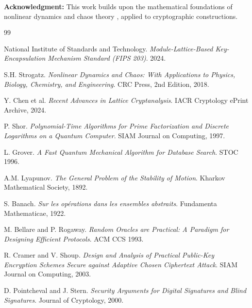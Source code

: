 \documentclass{article}
\begin{document}
\textbf{Acknowledgment:} This work builds upon the mathematical foundations of nonlinear dynamics and chaos theory \cite{strogatz2018}, applied to cryptographic constructions.

\begin{thebibliography}{99}

National Institute of Standards and Technology.
\textit{Module-Lattice-Based Key-Encapsulation Mechanism Standard (FIPS 203)}.
2024.

S.H. Strogatz.
\textit{Nonlinear Dynamics and Chaos: With Applications to Physics, Biology, Chemistry, and Engineering}.
CRC Press, 2nd Edition, 2018.

Y. Chen et al.
\textit{Recent Advances in Lattice Cryptanalysis}.
IACR Cryptology ePrint Archive, 2024.

P. Shor.
\textit{Polynomial-Time Algorithms for Prime Factorization and Discrete Logarithms on a Quantum Computer}.
SIAM Journal on Computing, 1997.

L. Grover.
\textit{A Fast Quantum Mechanical Algorithm for Database Search}.
STOC 1996.

A.M. Lyapunov.
\textit{The General Problem of the Stability of Motion}.
Kharkov Mathematical Society, 1892.

S. Banach.
\textit{Sur les op\'erations dans les ensembles abstraits}.
Fundamenta Mathematicae, 1922.

M. Bellare and P. Rogaway.
\textit{Random Oracles are Practical: A Paradigm for Designing Efficient Protocols}.
ACM CCS 1993.

R. Cramer and V. Shoup.
\textit{Design and Analysis of Practical Public-Key Encryption Schemes Secure against Adaptive Chosen Ciphertext Attack}.
SIAM Journal on Computing, 2003.

D. Pointcheval and J. Stern.
\textit{Security Arguments for Digital Signatures and Blind Signatures}.
Journal of Cryptology, 2000.

\end{thebibliography}
\end{document}
